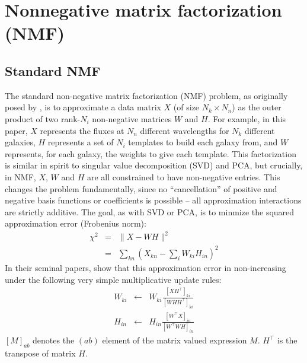 \documentclass[10pt,preprint]{aastex}
\newcommand{\T}{^{\scriptscriptstyle \top}}
\newcommand{\XX}{X}
\newcommand{\XXh}{\hat{X}}
\newcommand{\Xkn}{X_{kn}}
\newcommand{\WW}{W}
\newcommand{\Wki}{W_{ki}}
\newcommand{\HH}{H}
\newcommand{\Hin}{H_{in}}
\begin{document}

 

\appendix

\section{Nonnegative matrix factorization (NMF)}
\label{nmf}

\subsection{Standard NMF}
The standard non-negative matrix factorization (NMF) problem, as
originally posed by \cite{lee00a}, is to approximate a data matrix
$\XX$ (of size $N_k\times N_n$) as the outer product of two rank-$N_i$
non-negative matrices $\WW$ and $\HH$. For example, in this paper,
$\XX$ represents the fluxes at $N_n$ different wavelengths for $N_k$
different galaxies, $\HH$ represents a set of $N_i$ templates to build
each galaxy from, and $\WW$ represents, for each galaxy, the weights
to give each template. This factorization is similar in spirit to
singular value decomposition (SVD) and PCA, but crucially, in NMF,
$\XX$, $\WW$ and $\HH$ are all constrained to have non-negative
entries. This changes the problem fundamentally, since no
``cancellation'' of positive and negative basis functions or
coefficients is possible -- all approximation interactions are
strictly additive. The goal, as with SVD or PCA, is to minmize the
squared approximation error (Frobenius norm): 
\begin{eqnarray}
\label{eq:nmfcost}
\chi^2 &=& \|\XX-\WW\HH\|^2\\
&=& \sum_{kn} \left(\Xkn - \sum_i \Wki\Hin \right)^2
\end{eqnarray}
In their seminal papers, \cite{lee00a} show that this approximation
error in non-increasing under the following very simple multiplicative
update rules: 
\begin{eqnarray}
 \label{eq:wupdate}
\Wki &\leftarrow& \Wki \frac{[\XX\HH\T]_{ki}}{[\WW\HH\HH\T]_{ki}}\\
\label{eq:hupdate}
\Hin &\leftarrow& \Hin \frac{[\WW\T\XX]_{in}}{[\WW\T\WW\HH]_{in}}
\end{eqnarray}
$[M]_{ab}$ denotes the $(ab)$ element of the matrix valued expression
$M$. $\HH\T$ is the transpose of matrix $\HH$.
\end{document}
